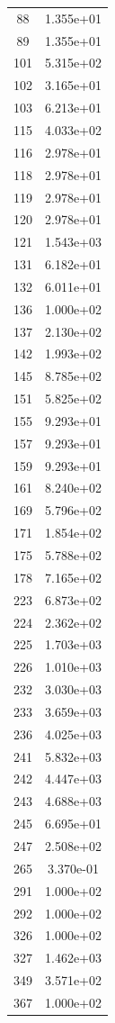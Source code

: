 \documentclass[12pt]{article}
\begin{document}
\begin{longtable}{@{}cc@{}}
88 & 1.355e+01 \\
89 & 1.355e+01 \\
101 & 5.315e+02 \\
102 & 3.165e+01 \\
103 & 6.213e+01 \\
115 & 4.033e+02 \\
116 & 2.978e+01 \\
118 & 2.978e+01 \\
119 & 2.978e+01 \\
120 & 2.978e+01 \\
121 & 1.543e+03 \\
131 & 6.182e+01 \\
132 & 6.011e+01 \\
136 & 1.000e+02 \\
137 & 2.130e+02 \\
142 & 1.993e+02 \\
145 & 8.785e+02 \\
151 & 5.825e+02 \\
155 & 9.293e+01 \\
157 & 9.293e+01 \\
159 & 9.293e+01 \\
161 & 8.240e+02 \\
169 & 5.796e+02 \\
171 & 1.854e+02 \\
175 & 5.788e+02 \\
178 & 7.165e+02 \\
223 & 6.873e+02 \\
224 & 2.362e+02 \\
225 & 1.703e+03 \\
226 & 1.010e+03 \\
232 & 3.030e+03 \\
233 & 3.659e+03 \\
236 & 4.025e+03 \\
241 & 5.832e+03 \\
242 & 4.447e+03 \\
243 & 4.688e+03 \\
245 & 6.695e+01 \\
247 & 2.508e+02 \\
265 & 3.370e-01 \\
291 & 1.000e+02 \\
292 & 1.000e+02 \\
326 & 1.000e+02 \\
327 & 1.462e+03 \\
349 & 3.571e+02 \\
367 & 1.000e+02 \\

\end{longtable}
\end{document}
